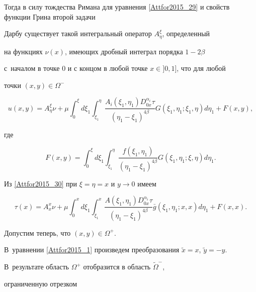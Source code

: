 Тогда в силу тождества Римана для уравнения \eqref{Attfor2015_29} и свойств функции Грина второй задачи 

Дарбу существует такой интегральный оператор $A_\eta^\xi$, определенный

на функциях $\nu(x)$, имеющих дробный интеграл порядка $1-2\beta$ 

с~началом в точке 0 и с концом в любой точке $x\in{}]0 , 1]$, что для любой

точки $(x,y)\in\Omega^-$

\begin{equation}

\label{Attfor2015_30}

u(x,y)=A_\eta^\xi \nu+\mu \int _0^\xi d\xi_1  \int _{\xi_1}^\eta

\frac{A_i(\xi_1,\eta_1) D_{0x}^{\alpha_i}\tau}{(\eta_1-\xi_1)^{4\beta}}

G(\xi_1,\eta_1;\xi_1,\eta)d\eta_1+F(x,y),

\end{equation}

где

$$

F(x,y)= \int _0^\xi d\xi_1  \int _{\xi_1}^\eta

\frac{f(\xi_1,\eta_1)}{(\eta_1-\xi_1)^{4\beta}}

G(\xi_1,\eta_1;\xi,\eta)d\eta_1.

$$



Из \ref{Attfor2015_30} при  $\xi=\eta=x$ и $y\rightarrow 0$ имеем

\begin{equation}

\label{Attfor2015_31}

\tau(x)=A_x^x \nu+\mu \int _0^x d\xi_1  \int _{\xi_1}^x

\frac{A(\xi_1,\eta_1) D_{0x}^{\alpha_i}\tau}{(\eta_1-\xi_1)^{4\beta}}

\bar{g}(\xi_1,\eta_1;x,x)d\eta_1+F(x,x).

\end{equation}



Допустим теперь, что $(x,y)\in\Omega^+$. 

В~уравнении \eqref{Attfor2015_1} произведем преобразования $\widetilde{x}=x$, $\widetilde{y}=-y$.

В~результате область $\Omega^+$ отобразится в область $\widetilde{\Omega}^-$,

ограниченную отрезком 

